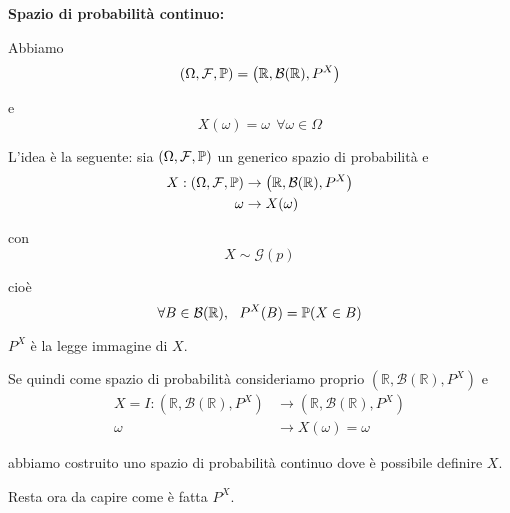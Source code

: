 \begin{enumerate}
\textbf{Spazio di probabilità continuo:}

Abbiamo\begin{equation*}
( \Omega ,\mathcal{F} ,\mathbb{P}) =\left(\mathbb{R} ,\mathcal{B}(\mathbb{R}) ,P^{X}\right)
\end{equation*}

e\begin{equation*}
X( \omega ) =\omega \ \ \forall \omega \in \Omega 
\end{equation*}

L'idea è la seguente: sia $( \Omega ,\mathcal{F} ,\mathbb{P})$ un generico spazio di probabilità e\begin{align*}
X:( \Omega ,\mathcal{F} ,\mathbb{P}) & \rightarrow \left(\mathbb{R} ,\mathcal{B}(\mathbb{R}) ,P^{X}\right)\\
\omega  & \rightarrow X( \omega )
\end{align*}

con\begin{equation*}
X\sim \mathcal{G}( p)
\end{equation*}

cioè\begin{equation*}
\forall B\in \mathcal{B}(\mathbb{R}) ,\ \ P^{X}( B) =\mathbb{P}( X\in B)
\end{equation*}

$P^{X}$ è la legge immagine di $X$.

Se quindi come spazio di probabilità consideriamo proprio $\left(\mathbb{R} ,\mathcal{B}(\mathbb{R}) ,P^{X}\right)$ e\begin{align*}
X=I:\left(\mathbb{R} ,\mathcal{B}(\mathbb{R}) ,P^{X}\right) & \rightarrow \left(\mathbb{R} ,\mathcal{B}(\mathbb{R}) ,P^{X}\right)\\
\omega  & \rightarrow X( \omega ) =\omega 
\end{align*}

abbiamo costruito uno spazio di probabilità continuo dove è possibile definire $X$.

Resta ora da capire come è fatta $P^{X}$.
\end{enumerate}
